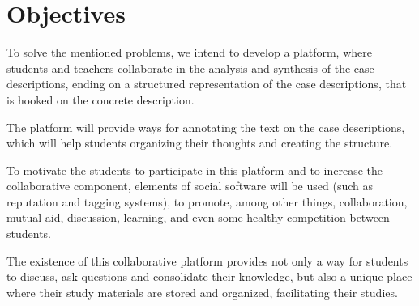 
\chapter{Objectives}
\label{chapter:objectives}
To solve the mentioned problems, we intend to develop a platform, where students and teachers collaborate in the analysis and synthesis of the case descriptions, ending on a structured representation of the case descriptions, that is hooked on the concrete description. 

The platform will provide ways for annotating the text on the case descriptions, which will help students organizing their thoughts and creating the structure. 

To motivate the students to participate in this platform and to increase the collaborative component, elements of social software will be used (such as reputation and tagging systems), to promote, among other things, collaboration, mutual aid, discussion, learning, and even some healthy competition between students.

 
The existence of this collaborative platform provides not only a way for students to discuss, ask questions and consolidate their knowledge, but also a unique place where their study materials are stored and organized, facilitating their studies.
